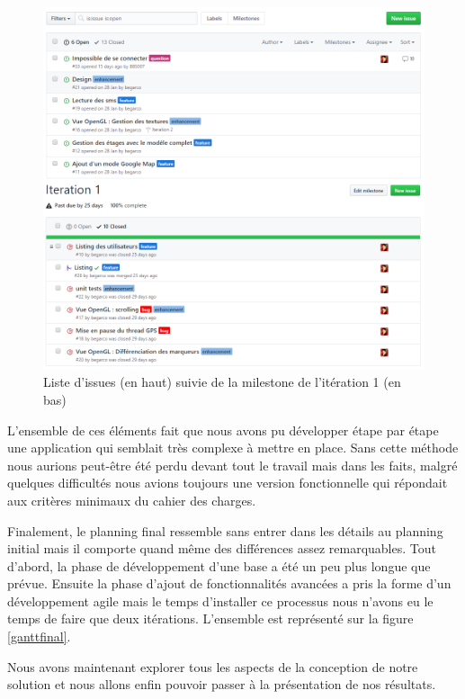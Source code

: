 \begin{figure}[H]
    \centering
    \includegraphics[width=\textwidth]{./img/issues.png}
    \caption{Liste d'issues (en haut) suivie de la milestone de l'itération 1 (en bas)}
    \label{milestone}
\end{figure}

L’ensemble de ces éléments fait que nous avons pu développer étape par étape une application qui semblait très complexe à mettre en place. Sans cette méthode nous aurions peut-être été perdu devant tout le travail mais dans les faits, malgré quelques difficultés nous avions toujours une version fonctionnelle qui répondait aux critères minimaux du cahier des charges.

Finalement, le planning final ressemble sans entrer dans les détails au planning initial mais il comporte quand même des différences assez remarquables. Tout d’abord, la phase de développement d’une base a été un peu plus longue que prévue. Ensuite la phase d’ajout de fonctionnalités avancées a pris la forme d’un développement agile mais le temps d’installer ce processus nous n’avons eu le temps de faire que deux itérations. L’ensemble est représenté sur la figure \ref{ganttfinal}.

Nous avons maintenant explorer tous les aspects de la conception de notre solution et nous allons enfin pouvoir passer à la présentation de nos résultats.

